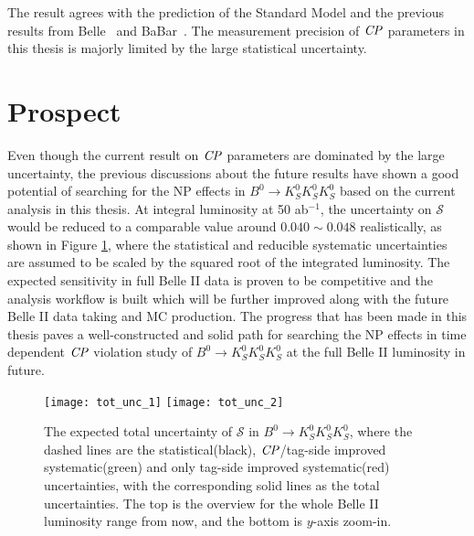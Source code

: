 The result agrees with the prediction of the Standard Model and the previous results from Belle~\cite{kang2020measurement} and BaBar~\cite{lees2012amplitude}. The measurement precision of $\it{CP}$ parameters in this thesis is majorly limited by the large statistical uncertainty.


\section{Prospect}
Even though the current result on $\it{CP}$ parameters are dominated by the large uncertainty, the previous discussions about the future results have shown a good potential of searching for the NP effects in $B^0 \to K_S^0  K_S^0  K_S^0$ based on the current analysis in this thesis. At integral luminosity at 50 ab$^{-1}$, the uncertainty on $\mathcal{S}$ would be reduced to a comparable value around $0.040\sim0.048$ realistically, as shown in Figure \ref{fig:tot_exp}, where the statistical and reducible systematic uncertainties are assumed to be scaled by the squared root of the integrated luminosity. The expected sensitivity in full Belle II data is proven to be competitive and the analysis workflow is built which will be further improved along with the future Belle II data taking and MC production. The progress that has been made in this thesis paves a well-constructed and solid path for searching the NP effects in time dependent $\it{CP}$ violation study of $B^0 \to K_S^0  K_S^0  K_S^0$ at the full Belle II luminosity in future.
 
\begin{figure}[htpb]
	\centering
	\texttt{[image: tot\_unc\_1]}
	\texttt{[image: tot\_unc\_2]}
	\caption{The expected total uncertainty of $\mathcal{S}$ in $B^0 \to K_S^0  K_S^0  K_S^0$, where the dashed lines are the statistical(black), $\it{CP}$/tag-side improved systematic(green) and only tag-side improved systematic(red) uncertainties, with the corresponding solid lines as the total uncertainties. The top is the overview for the whole Belle II luminosity range from now, and the bottom is $y$-axis zoom-in.}
	\label{fig:tot_exp}
\end{figure}

